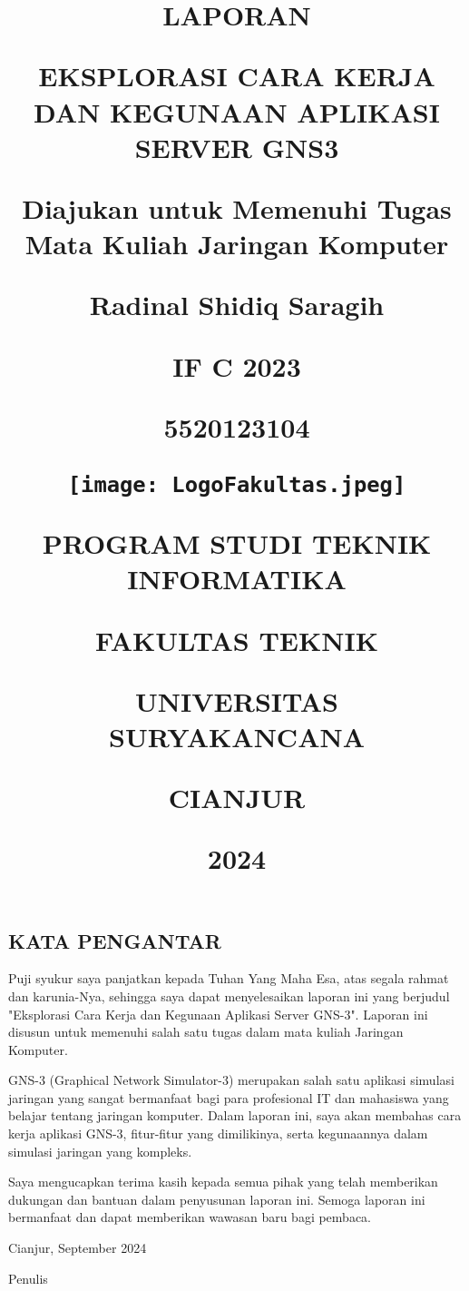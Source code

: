 \documentclass[12pt, a4paper]{article}
\date{}
\title{

  \large{\textbf{LAPORAN}}

  \large{\textbf{EKSPLORASI CARA KERJA DAN KEGUNAAN APLIKASI SERVER GNS3}}

  {\large{Diajukan untuk Memenuhi Tugas Mata Kuliah Jaringan Komputer}}

  {\vspace{1cm}}

  \normalsize{Radinal Shidiq Saragih}

  {\vspace{0.5cm}}

  \normalsize{IF C 2023}

  {\vspace{0.5cm}}

  \normalsize{5520123104}

  {\vspace{1cm}}

  {\texttt{[image: LogoFakultas.jpeg]}}

  {\vspace{2cm}}

  {\large{PROGRAM STUDI TEKNIK INFORMATIKA}}

  {\large{FAKULTAS TEKNIK}}

  {\large{UNIVERSITAS SURYAKANCANA}}

  {\large{CIANJUR}}

  {\small{2024}}
}
\begin{document}
  \begin{titlepage}
    \maketitle
  \end{titlepage}


  \begin{center}
    \section*{KATA PENGANTAR}
  \end{center}

  \setcounter{section}{1}

  \setcounter{subsection}{0}



  \vspace{1cm}


  Puji syukur saya panjatkan kepada Tuhan Yang Maha Esa, atas segala rahmat dan
  karunia-Nya, sehingga saya dapat menyelesaikan laporan ini yang berjudul
  "Eksplorasi Cara Kerja dan Kegunaan Aplikasi Server GNS-3".
  Laporan ini disusun untuk memenuhi salah satu tugas dalam mata kuliah
  Jaringan Komputer.


  GNS-3 (Graphical Network Simulator-3) merupakan salah satu aplikasi
  simulasi jaringan yang sangat bermanfaat bagi para profesional IT dan mahasiswa
  yang belajar tentang jaringan komputer. Dalam laporan ini, saya akan membahas
  cara kerja aplikasi GNS-3, fitur-fitur yang dimilikinya, serta kegunaannya
  dalam simulasi jaringan yang kompleks.


  Saya mengucapkan terima kasih kepada semua pihak yang telah memberikan dukungan
  dan bantuan dalam penyusunan laporan ini. Semoga laporan ini bermanfaat dan
  dapat memberikan wawasan baru bagi pembaca.

  \vspace{1cm}

  \begin{flushright}
    Cianjur, September 2024

    \vspace{0.5cm}

    Penulis
  \end{flushright}

  \newpage

  \renewcommand\contentsname {\Large{\textbf{DAFTAR ISI}} }
\end{document}
